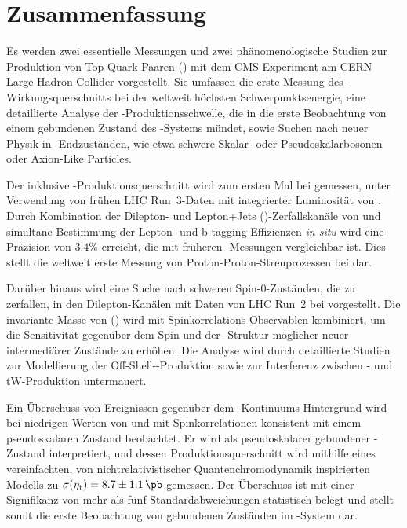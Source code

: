 \cleardoublepage %
\chapter*{Zusammenfassung}

\enlargethispage{2\baselineskip}

Es werden zwei essentielle Messungen und zwei ph{\"a}nomenologische Studien zur Produktion von Top-Quark-Paaren (\ttbar) mit dem CMS-Experiment am CERN Large Hadron Collider vorgestellt. 
Sie umfassen die erste Messung des \ttbar-Wir\-kungs\-quer\-schnitts bei der weltweit h{\"o}chsten Schwerpunktsenergie, eine detaillierte Analyse der \ttbar-Produktionsschwelle, die in die erste Beobachtung von einem gebundenen Zustand des \ttbar-Systems m{\"u}ndet, sowie Suchen nach neuer Physik in \ttbar-Endzust{\"a}nden, wie etwa schwere Skalar- oder Pseudoskalarbosonen oder Axion-Like Particles.

Der inklusive \ttbar-Produktionsquerschnitt \sigmatt wird zum ersten Mal bei \sqrtsRIII gemessen, unter Verwendung von fr{\"u}hen LHC Run~3-Daten mit integrierter Luminosit{\"a}t von \lumiRIII. Durch Kombination der Dilepton- und Lepton+Jets (\ljets)-Zerfallskan{\"a}le von \ttbar und simultane Bestimmung der Lepton- und b-tagging-Effizienzen \textit{in situ} wird eine Pr{\"a}zision von $3.4\%$ erreicht, die mit fr{\"u}heren \sigmatt-Messungen vergleichbar ist. 
Dies stellt die weltweit erste Messung von Proton-Proton-Streuprozessen bei \sqrtsRIII dar.


Dar{\"u}ber hinaus wird eine Suche nach schweren Spin-0-Zust{\"a}nden, die zu \ttbar zerfallen, in den Dilepton-Kan{\"a}len mit \lumiRII Daten von LHC Run~2 bei \sqrtsRII vorgestellt. Die invariante Masse von \ttbar (\mtt) wird mit Spinkorrelations-Observablen kombiniert, um die Sensitivit{\"a}t gegen{\"u}ber dem Spin und der \CP-Struktur m{\"o}glicher neuer intermedi{\"a}rer Zust{\"a}nde zu erh{\"o}hen. 
Die Analyse wird durch detaillierte Studien zur Modellierung der Off-Shell-\ttbar-Produktion sowie zur Interferenz zwischen \ttbar- und tW-Produktion untermauert.

Ein {\"U}berschuss von Ereignissen gegen{\"u}ber dem \ttbar-Kontinuums-Hintergrund wird bei niedrigen Werten von \mtt und mit Spinkorrelationen konsistent mit einem pseudoskalaren Zustand beobachtet. Er wird als pseudoskalarer gebundener \ttbar-Zustand \etat interpretiert, und dessen Produktionsquerschnitt wird mithilfe eines vereinfachten, von nichtrelativistischer Quantenchromodynamik inspirierten Modells zu $\sigetat =  8.7 \pm 1.1  \, \si{\pb}$ gemessen. 
Der {\"U}berschuss ist mit einer Signifikanz von mehr als f{\"u}nf Standardabweichungen statistisch belegt und stellt somit die erste Beobachtung von gebundenen Zust{\"a}nden im \ttbar-System dar.

